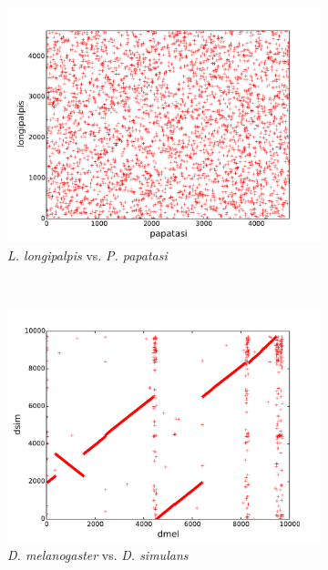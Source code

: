 \begin{figure}[H]
  \centering
  \begin{subfigure}[b]{0.45\textwidth}
    \includegraphics[width=\textwidth]{figures/synteny/papatasi_longipalpis_plot}
    \caption{\emph{L. longipalpis} vs. \emph{P. papatasi}}
  \end{subfigure}
  ~
  \begin{subfigure}[b]{0.45\textwidth}
    \includegraphics[width=\textwidth]{figures/synteny/dmel_dsim_plot}
    \caption{\emph{D. melanogaster} vs. \emph{D. simulans}}
  \end{subfigure}
  ~
  \begin{subfigure}[b]{0.45\textwidth}

\end{subfigure}
\end{figure}
